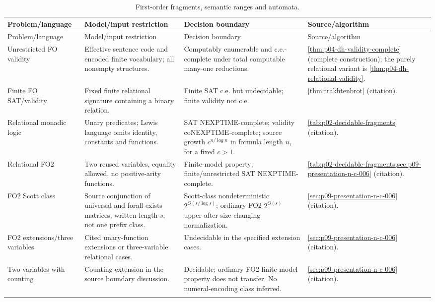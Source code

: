 \begin{landscape}
\begingroup\small\setlength{\tabcolsep}{3pt}
\begin{longtable}{@{}p{.18\linewidth}p{.25\linewidth}p{.23\linewidth}p{.26\linewidth}@{}}
\caption{First-order fragments, semantic ranges and automata.}\label{tab:p14-dc-finite}\\
\toprule
Problem/language & Model/input restriction & Decision boundary & Source/algorithm\\\midrule
\endfirsthead
\toprule
Problem/language & Model/input restriction & Decision boundary & Source/algorithm\\\midrule
\endhead
\bottomrule\endfoot
Unrestricted FO validity & Effective sentence code and encoded finite vocabulary; all nonempty structures. & Computably enumerable and c.e.-complete under total computable many-one reductions. & \cref{thm:p04-dh-validity-complete} (complete construction); the purely relational variant is \cref{thm:p04-dh-relational-validity}.\\\addlinespace
Finite FO SAT/validity & Fixed finite relational signature containing a binary relation. & Finite SAT c.e. but undecidable; finite validity not c.e. & \cref{thm:trakhtenbrot} (citation).\\\addlinespace
Relational monadic logic & Unary predicates; Lewis language omits identity, constants and functions. & SAT NEXPTIME-complete; validity coNEXPTIME-complete; source growth \(c^{n/\log n}\) in formula length \(n\), for a fixed \(c>1\). & \cref{tab:p02-decidable-fragments} (citation).\\\addlinespace
Relational FO2 & Two reused variables, equality allowed, no positive-arity functions. & Finite-model property; finite/unrestricted SAT NEXPTIME-complete. & \cref{tab:p02-decidable-fragments,sec:p09-presentation-n-c-006} (citation).\\\addlinespace
FO2 Scott class & Source conjunction of universal and forall-exists matrices, written length \(s\); not one prefix class. & Scott-class nondeterministic \(2^{O(s/\log s)}\); ordinary FO2 \(2^{O(s)}\) upper after size-changing normalization. & \cref{sec:p09-presentation-n-c-006} (citation).\\\addlinespace
FO2 extensions/three variables & Cited unary-function extensions or three-variable relational cases. & Undecidable in the specified extension cases. & \cref{sec:p09-presentation-n-c-006} (citation).\\\addlinespace
Two variables with counting & Counting extension in the source boundary discussion. & Decidable; ordinary FO2 finite-model property does not transfer. No numeral-encoding class inferred. & \cref{sec:p09-presentation-n-c-006} (citation).\\\addlinespace

\end{longtable}
\end{landscape}
